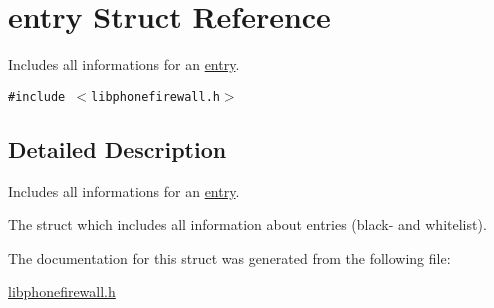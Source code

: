 \hypertarget{structentry}{
\section{entry Struct Reference}
\label{structentry}
}
Includes all informations for an \hyperlink{structentry}{entry}.  


{\tt \#include $<$libphonefirewall.h$>$}



\subsection{Detailed Description}
Includes all informations for an \hyperlink{structentry}{entry}. 

The struct which includes all information about entries (black- and whitelist). 

The documentation for this struct was generated from the following file:\begin{CompactItemize}
\item 
\hyperlink{libphonefirewall_8h}{libphonefirewall.h}\end{CompactItemize}
